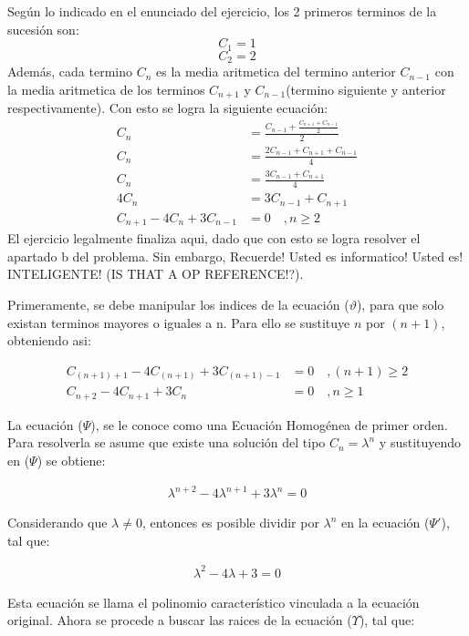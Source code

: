 Según lo indicado en el enunciado del ejercicio, los 2 primeros terminos de la sucesión son:
$$C_1=1$$
$$C_2=2$$
Además, cada termino $C_n$ es la media aritmetica del termino anterior $C_{n-1}$ con la media aritmetica de los terminos $C_{n+1}$ y $C_{n-1}$(termino siguiente y anterior respectivamente). Con esto se logra la siguiente ecuación:
\begin{align*}
    C_n &= \frac{C_{n-1} + \frac{C_{n+1}+C_{n-1}}{2}}{2} \\
    C_n &= \frac{2C_{n-1} + C_{n+1} + C_{n-1}}{4} \\
    C_n &= \frac{3C_{n-1} + C_{n+1}}{4} \\
    4C_n &= 3C_{n-1} + C_{n+1} \\
    C_{n+1} -4C_n + 3C_{n-1} &= 0 \quad ,n \ge 2  \tag{$\vartheta$}
\end{align*}
El ejercicio legalmente finaliza aqui, dado que con esto se logra resolver el apartado b del problema. Sin embargo, Recuerde! Usted es informatico! Usted es! INTELIGENTE! (IS THAT A OP REFERENCE!?).

Primeramente, se debe manipular los indices de la ecuación ($\vartheta$), para que solo existan terminos mayores o iguales a n. Para ello se sustituye $n$ por $(n+1)$, obteniendo asi:

\begin{align*}
    C_{(n+1)+1}-4C_{(n+1)}+3C_{(n+1)-1}&=0 \quad ,(n+1) \ge 2 \\
    C_{n+2}-4C_{n+1}+3C_{n}&=0 \quad ,n \ge 1 \tag{$\Psi$}
\end{align*}

La ecuación ({$\Psi$}), se le conoce como una Ecuación Homogénea de primer orden. Para resolverla se asume que existe una solución del tipo $C_n = \lambda^n$ y sustituyendo en ({$\Psi$}) se obtiene:

\begin{align*}
\lambda^{n+2} -4\lambda^{n+1} + 3\lambda^{n} = 0 \tag{$\Psi'$}
\end{align*}


Considerando que $\lambda\neq0$, entonces es posible dividir por $\lambda^n$ en la ecuación ($\Psi'$), tal que:

\begin{align*}
  \lambda^{2} -4\lambda + 3 = 0 \tag{$\Upsilon$}  
\end{align*}

Esta ecuación se llama el polinomio característico vinculada a la ecuación original. Ahora se procede a buscar las raices de la ecuación ($\Upsilon$), tal que:
 
